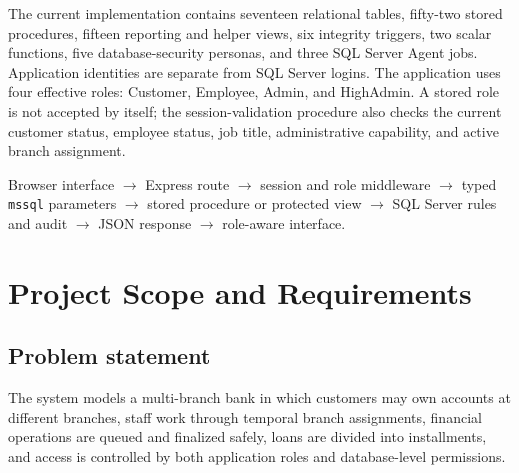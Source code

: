 \documentclass[11pt,a4paper,oneside]{report}
\begin{document}
The current implementation contains seventeen relational tables, fifty-two stored procedures, fifteen reporting and helper views, six integrity triggers, two scalar functions, five database-security personas, and three SQL Server Agent jobs. Application identities are separate from SQL Server logins. The application uses four effective roles: Customer, Employee, Admin, and HighAdmin. A stored role is not accepted by itself; the session-validation procedure also checks the current customer status, employee status, job title, administrative capability, and active branch assignment.

\begin{defensebox}
Browser interface $\rightarrow$ Express route $\rightarrow$ session and role middleware $\rightarrow$ typed \texttt{mssql} parameters $\rightarrow$ stored procedure or protected view $\rightarrow$ SQL Server rules and audit $\rightarrow$ JSON response $\rightarrow$ role-aware interface.
\end{defensebox}

\tableofcontents
\listoftables
\listoffigures
\clearpage
{}

\chapter{Project Scope and Requirements}
\section{Problem statement}
The system models a multi-branch bank in which customers may own accounts at different branches, staff work through temporal branch assignments, financial operations are queued and finalized safely, loans are divided into installments, and access is controlled by both application roles and database-level permissions.
\end{document}
